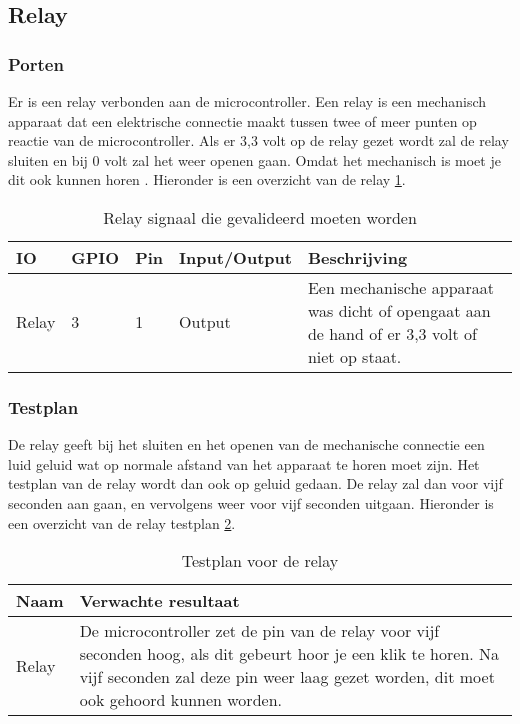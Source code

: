 \subsection{Relay}
\subsubsection{Porten}
Er is een relay verbonden aan de microcontroller. Een relay is een mechanisch apparaat dat een elektrische connectie maakt tussen twee of meer punten op reactie van de microcontroller. Als er 3,3 volt op de relay gezet wordt zal de relay sluiten en bij 0 volt zal het weer openen gaan. Omdat het mechanisch is moet je dit ook kunnen horen \autocite{relay}. Hieronder is een overzicht van de relay \ref{tab:hw_val_relay}.

\begin{table}[h!]
	\caption{Relay signaal die gevalideerd moeten worden}
	\begin{tabular}{llllp{9cm}}
	\toprule
	\textbf{IO} & \textbf{GPIO} & \textbf{Pin} & \textbf{Input/Output} & \textbf{Beschrijving}			\\ \toprule
	Relay		& 3 & 1   	& Output		& Een mechanische apparaat was dicht of opengaat aan de hand of er 3,3 volt of niet op staat.	\\ \bottomrule
	\end{tabular}
	\label{tab:hw_val_relay}
\end{table}
\subsubsection{Testplan}
De relay geeft bij het sluiten en het openen van de mechanische connectie een luid geluid wat op normale afstand van het apparaat te horen moet zijn. Het testplan van de relay wordt dan ook op geluid gedaan. De relay zal dan voor vijf seconden aan gaan, en vervolgens weer voor vijf seconden uitgaan. Hieronder is een overzicht van de relay testplan \ref{tab:hw_val_relay_testplan}.

\begin{table}[h!]
	\caption{Testplan voor de relay}
	\begin{tabular}{lp{14.5cm}}
	\toprule
	\textbf{Naam} 	& \textbf{Verwachte resultaat} \\ \toprule
	Relay			& De microcontroller zet de pin van de relay voor vijf seconden hoog, als dit gebeurt hoor je een klik te horen. Na vijf seconden zal deze pin weer laag gezet worden, dit moet ook gehoord kunnen worden.\\  \bottomrule
	\end{tabular}
	\label{tab:hw_val_relay_testplan}
\end{table}
\newpage

